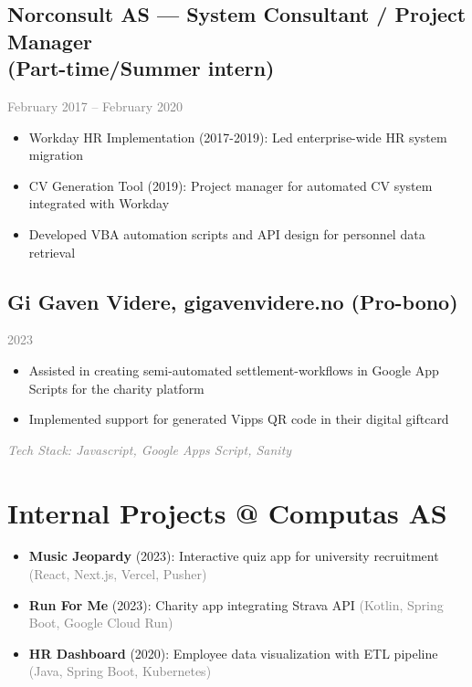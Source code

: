 \documentclass[11pt,a4paper]{article}
\begin{document}
\subsection{Norconsult AS — System Consultant / Project Manager \\ (Part-time/Summer intern)}
\textcolor{gray}{February 2017 – February 2020}
\begin{itemize}[itemsep=0.3em, leftmargin=*]
\item Workday HR Implementation (2017-2019): Led enterprise-wide HR system migration
\item CV Generation Tool (2019): Project manager for automated CV system integrated with Workday
\item Developed VBA automation scripts and API design for personnel data retrieval
\end{itemize}

\vspace{10pt}

\subsection{Gi Gaven Videre, gigavenvidere.no (Pro-bono)}
\textcolor{gray}{2023}
\begin{itemize}[itemsep=0.3em, leftmargin=*]
\item Assisted in creating semi-automated settlement-workflows in Google App Scripts for the charity platform  
\item Implemented support for generated Vipps QR code in their digital giftcard
\end{itemize}
\textcolor{gray}{\textit{Tech Stack: Javascript, Google Apps Script, Sanity  }}

\clearpage
\section{Internal Projects @ Computas AS}

\begin{itemize}[itemsep=0.5em, leftmargin=*]
\item \textbf{Music Jeopardy} (2023): Interactive quiz app for university recruitment \textcolor{gray}{(React, Next.js, Vercel, Pusher)}
\item \textbf{Run For Me} (2023): Charity app integrating Strava API \textcolor{gray}{(Kotlin, Spring Boot, Google Cloud Run)}
\item \textbf{HR Dashboard} (2020): Employee data visualization with ETL pipeline \textcolor{gray}{(Java, Spring Boot, Kubernetes)}
\end{itemize}
\end{document}
